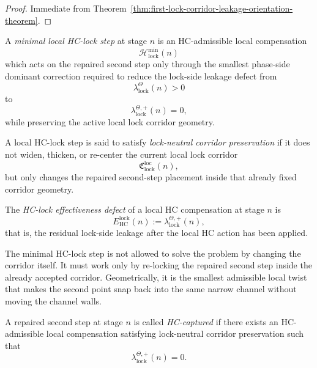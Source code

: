 \begin{proof}
Immediate from Theorem~\ref{thm:first-lock-corridor-leakage-orientation-theorem}.
\end{proof}



\begin{definition}
\label{def:minimal-local-hc-lock-step}
A \emph{minimal local HC-lock step} at stage $n$ is an HC-admissible local compensation
\[
  \mathcal H^{\min}_{\mathrm{lock}}(n)
\]
which acts on the repaired second step only through the smallest phase-side dominant correction required to reduce the lock-side leakage defect from
\[
  \lambda_{\mathrm{lock}}^{\Theta}(n)>0
\]
to
\[
  \lambda_{\mathrm{lock}}^{\Theta,+}(n)=0,
\]
while preserving the active local lock corridor geometry.
\end{definition}

\begin{definition}
\label{def:lock-neutral-corridor-preservation}
A local HC-lock step is said to satisfy \emph{lock-neutral corridor preservation} if it does not widen, thicken, or re-center the current local lock corridor
\[
  \mathfrak C_{\mathrm{lock}}^{\mathrm{loc}}(n),
\]
but only changes the repaired second-step placement inside that already fixed corridor geometry.
\end{definition}

\begin{definition}
\label{def:hc-lock-effectiveness-defect}
The \emph{HC-lock effectiveness defect} of a local HC compensation at stage $n$ is
\[
  E_{\mathrm{HC}}^{\mathrm{lock}}(n)
  :=
  \lambda_{\mathrm{lock}}^{\Theta,+}(n),
\]
that is, the residual lock-side leakage after the local HC action has been applied.
\end{definition}

\begin{remark}
\label{rem:what-the-minimal-hc-step-is-allowed-to-do}
The minimal HC-lock step is not allowed to solve the problem by changing the corridor itself. It must work only by re-locking the repaired second step inside the already accepted corridor. Geometrically, it is the smallest admissible local twist that makes the second point snap back into the same narrow channel without moving the channel walls.
\end{remark}

\begin{definition}
\label{def:hc-captured-local-repaired-second-step}
A repaired second step at stage $n$ is called \emph{HC-captured} if there exists an HC-admissible local compensation satisfying lock-neutral corridor preservation such that
\[
  \lambda_{\mathrm{lock}}^{\Theta,+}(n)=0.
\]
\end{definition}

